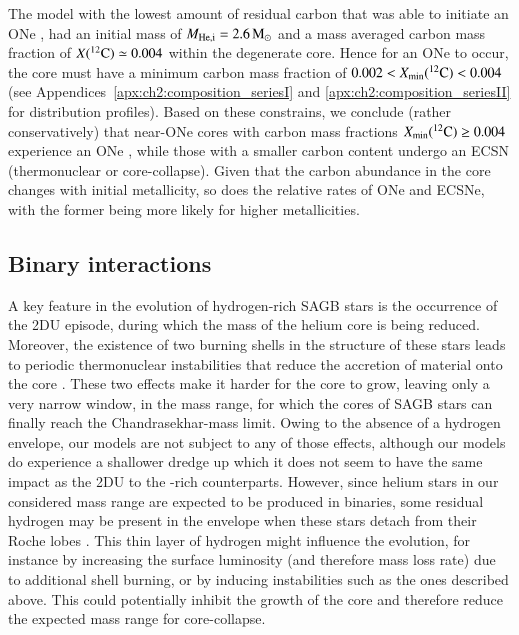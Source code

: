 \documentclass[main.tex]{subfiles}
\begin{document}
The  model with the lowest amount of residual carbon that was able to initiate an ONe \ia, 
had an initial mass of $M_{\rm He, i}=2.6\msun$ and a mass averaged carbon mass fraction of $X(\iso{C}{12})\simeq 0.004$ within the degenerate core. 
Hence for an ONe \ia to occur, the core must have a minimum carbon mass fraction of $0.002 < X_{\rm min}(\iso{C}{12}) < 0.004$ (see Appendices~\ref{apx:ch2:composition_seriesI} and \ref{apx:ch2:composition_seriesII} for distribution profiles).  
Based on these constrains, we conclude (rather conservatively) that near-\mch  ONe cores with carbon mass fractions $X_{\rm min}(\iso{C}{12}) \geq 0.004$ experience an ONe \ia, while those with a smaller carbon content undergo an ECSN (thermonuclear or core-collapse).
Given that the carbon abundance in the core changes with initial metallicity, so does the relative rates of ONe \ias and ECSNe, with the former being more likely for higher metallicities. 




\subsection{Binary interactions}

A key feature in the evolution of hydrogen-rich SAGB stars is the occurrence of the 
2DU episode, during which the mass of the helium core is being reduced. Moreover, the existence of two 
burning shells in the structure of these stars leads to periodic thermonuclear instabilities 
that reduce the accretion of material onto the core \citep{Denissenkov:2013qaa}. 
These two effects make it harder for the 
core to grow, leaving only a very narrow window, in the mass range, for which the cores of SAGB 
stars can finally reach the Chandrasekhar-mass limit. Owing to the absence of a hydrogen envelope, 
our models are not subject to any of those effects, although our models do experience a shallower dredge up which it does not seem to have the same impact as the 2DU to the -rich counterparts. However, since helium stars in our considered mass range are expected to be produced in binaries, some residual hydrogen may be present in the envelope when these stars detach from their Roche lobes \citep[][and references therein]{Sen:2022abc}. This thin layer of hydrogen might  
influence the evolution, for instance by increasing the surface luminosity (and therefore mass loss rate) due to additional shell burning, or by inducing  instabilities such as the ones described above. This could potentially inhibit the growth of the core and therefore reduce the expected mass range for core-collapse.  
\end{document}
